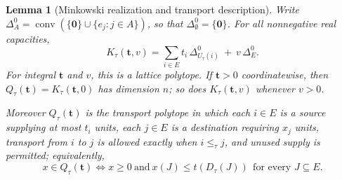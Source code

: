 \documentclass[11pt]{article}
\numberwithin{equation}{section}
\newtheorem{lemma}[theorem]{Lemma}
\theoremstyle{definition}
\theoremstyle{remark}
\newcommand{\zero}{\mathbf 0}
\newcommand{\conv}{\operatorname{conv}}
\newcommand{\Dz}[1]{\Delta^{0}_{#1}}
\begin{document}
\begin{lemma}[Minkowski realization and transport description]
\label{lem:transport}
Write $\Dz A=\conv(\{\zero\}\cup\{e_j:j\in A\})$, so that
$\Dz\emptyset=\{\zero\}$. For all nonnegative real capacities,
\begin{equation}
 K_\tau(\mathbf t,v)
 =\sum_{i\in E} t_i\,\Dz{U_\tau(i)}\ +\ v\,\Dz E .
 \label{eq:minkowski}
\end{equation}
For integral $\mathbf t$ and $v$, this is a lattice polytope. If $\mathbf t>0$
coordinatewise, then $Q_\tau(\mathbf t)=K_\tau(\mathbf t,0)$ has dimension
$n$; so does $K_\tau(\mathbf t,v)$ whenever $v>0$.

Moreover $Q_\tau(\mathbf t)$ is the transport polytope in which each $i\in E$
is a source supplying at most $t_i$ units, each $j\in E$ is a destination
requiring $x_j$ units, transport from $i$ to $j$ is allowed exactly when
$i\le_\tau j$, and unused supply is permitted; equivalently,
\begin{equation}
 x\in Q_\tau(\mathbf t)
 \iff
 x\ge0\ \text{and}\
 x(J)\le t(D_\tau(J))\ \ \text{for every }J\subseteq E.
 \label{eq:hall-demand}
\end{equation}
\end{lemma}
\end{document}
